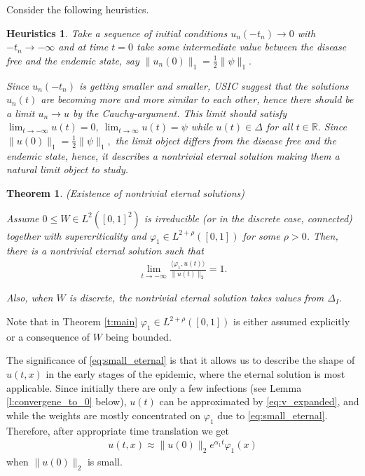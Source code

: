 \documentclass{article}
\newcommand{\1}[1]{{\mathds{1}}_{\left\{#1\right\}}}
\newtheorem{theorem}{Theorem}
\newtheorem{heuristics}{Heuristics}
\begin{document}
Consider the following heuristics.


\begin{heuristics}
Take a sequence of initial conditions $u_n(-t_n) \to 0$ with $-t_n \to -\infty$ and at time $t=0$ take some intermediate value between the disease free and the endemic state, say  $\|u_n(0)\|_1=\frac{1}{2}\| \psi \|_1.$

Since $u_n(-t_n)$ is getting smaller and smaller, USIC suggest that the solutions $u_n(t)$ are becoming more and more similar to each other, hence there should be a limit $u_n \to u$ by the Cauchy-argument. This limit should satisfy $\lim_{t \to -\infty}u(t)=0, \ \lim_{t \to \infty}u(t)=\psi$ while $u(t) \in \Delta$ for all $t \in \mathbb{R}.$ Since $\|u(0)\|_1=\frac{1}{2}\| \psi \|_1,$ the limit object differs from the disease free and the endemic state, hence, it describes a nontrivial eternal solution making them a natural limit object to study.
\end{heuristics}

\begin{theorem}(Existence of nontrivial eternal solutions)
\label{t:existence}	

Assume $0 \leq W \in L^2([0,1]^2)$ is irreducible (or in the discrete case, connected) together with  supercriticality and $\varphi_1 \in L^{2+\rho}([0,1])$ for some $\rho>0$. Then, there is a nontrivial eternal solution such that
\begin{align}
\label{eq:small_eternal}
\lim_{t \to -\infty} \frac{\langle \varphi_1, u(t) \rangle}{\| u(t)\|_2}=1.
\end{align}

Also, when $W$ is discrete, the nontrivial eternal solution takes values from $\Delta_I.$
\end{theorem}	

Note that in Theorem \ref{t:main} $\varphi_1 \in L^{2+\rho}([0,1])$ is either assumed explicitly or a consequence of $W$ being bounded.

The significance of \eqref{eq:small_eternal} is that it allows us to describe the shape of $u(t,x)$ in the early stages of the epidemic, where the eternal solution is most applicable. Since initially there are only a few infections (see Lemma \ref{l:convergene_to_0} below), $u(t)$ can be approximated by \eqref{eq:v_expanded}, and while the weights are mostly concentrated on $\varphi_1$ due to \eqref{eq:small_eternal}. Therefore, after appropriate time translation we get
\begin{align}
\label{eq:small_eternal2}
u(t,x) \approx \|u(0) \|_2 e^{\alpha_1 t} \varphi_1(x)
\end{align}
when $\|u(0) \|_2$ is small.
\end{document}
